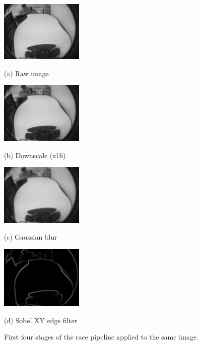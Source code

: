 \documentclass{article}
\begin{document}
\begin{figure}[htb]
\begin{minipage}[b]{.48\linewidth}
	\centering
	\centerline{\includegraphics[width=4.0cm]{vis_figs/raw}}
	\centerline{(a) Raw image}\medskip
\end{minipage}
\hfill
\begin{minipage}[b]{0.48\linewidth}
	\centering
	\centerline{\includegraphics[width=4.0cm]{vis_figs/downscale}}
	\centerline{(b) Downscale (x16)}\medskip
\end{minipage}
%
\begin{minipage}[b]{.48\linewidth}
	\centering
	\centerline{\includegraphics[width=4.0cm]{vis_figs/gaussian}}
	\centerline{(c) Gaussian blur}\medskip
\end{minipage}
\hfill
\begin{minipage}[b]{0.48\linewidth}
	\centering
	\centerline{\includegraphics[width=4.0cm]{vis_figs/gradient}}
	\centerline{(d) Sobel XY edge filter}\medskip
\end{minipage}
%
\caption{First four stages of the race pipeline applied to the
	same image.}
\label{fig:vis1}
%
\end{figure}
\end{document}
